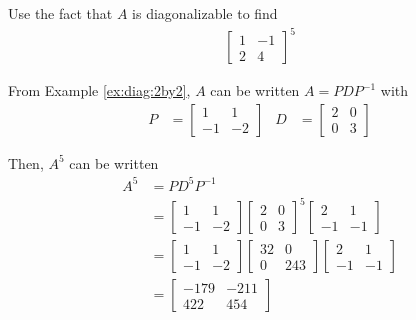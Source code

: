 \begin{example}
Use the fact that $A$ is diagonalizable to find
%
\begin{align*}
\begin{bmatrix}
1 & -1 \\
2 & 4 
\end{bmatrix}^5
\end{align*}

\solution

From Example \ref{ex:diag:2by2}, $A$ can be written $A=PDP^{-1}$ with
%
\begin{align*}
P & = \begin{bmatrix}
1 & 1 \\ -1 & -2 
\end{bmatrix} & D & = \begin{bmatrix}
2 & 0 \\
0 & 3
\end{bmatrix}
\end{align*}

Then, $A^5$ can be written
%
\begin{align*}
A^5 & = P D^5 P^{-1} \\
& = \begin{bmatrix}
1 & 1 \\
-1 & -2 
\end{bmatrix} \begin{bmatrix}
2 & 0 \\
0 & 3
\end{bmatrix}^5  \begin{bmatrix}
2 & 1 \\
-1 & -1
\end{bmatrix} \\
& = \begin{bmatrix}
1 & 1 \\
-1 & -2
\end{bmatrix} \begin{bmatrix}
32 & 0 \\
0 & 243
\end{bmatrix} \begin{bmatrix}
2 & 1 \\
-1 & -1 
\end{bmatrix} \\
& = \begin{bmatrix}
-179 & -211 \\
422 & 454
\end{bmatrix}
\end{align*}
\end{example}


